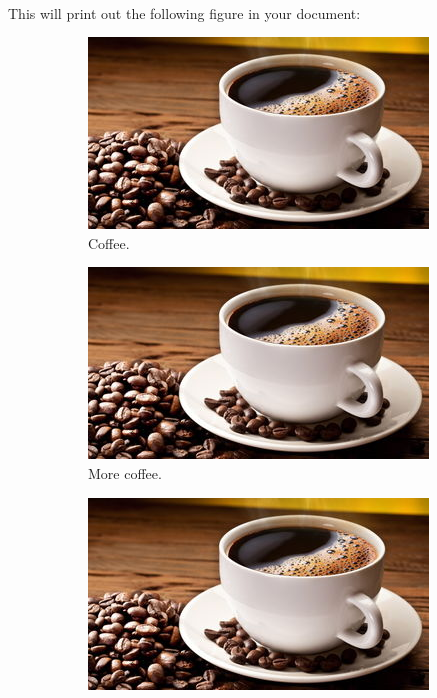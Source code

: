     \paragraph{ }
      This will print out the following figure in your document:
      \begin{figure}[h!]
        \centering
        \begin{subfigure}[b]{0.2\linewidth}
          \includegraphics[width=\linewidth]{graphics/coffee.jpg}
           \caption{Coffee.}
        \end{subfigure}
        \begin{subfigure}[b]{0.2\linewidth}
          \includegraphics[width=\linewidth]{graphics/coffee.jpg}
          \caption{More coffee.}
        \end{subfigure}
        \begin{subfigure}[b]{0.2\linewidth}
          \includegraphics[width=\linewidth]{graphics/coffee.jpg}

\end{subfigure}
\end{figure}
